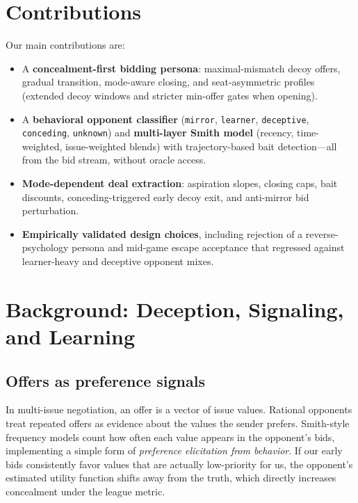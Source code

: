 \documentclass[11pt]{article}
\begin{document}
\section{Contributions}

Our main contributions are:
\begin{itemize}
  \item A \textbf{concealment-first bidding persona}: maximal-mismatch decoy offers, gradual
        transition, mode-aware closing, and seat-asymmetric profiles (extended decoy windows and
        stricter min-offer gates when opening).
  \item A \textbf{behavioral opponent classifier} (\texttt{mirror}, \texttt{learner},
        \texttt{deceptive}, \texttt{conceding}, \texttt{unknown}) and \textbf{multi-layer Smith
        model} (recency, time-weighted, issue-weighted blends) with trajectory-based bait
        detection---all from the bid stream, without oracle access.
  \item \textbf{Mode-dependent deal extraction}: aspiration slopes, closing caps, bait discounts,
        conceding-triggered early decoy exit, and anti-mirror bid perturbation.
  \item \textbf{Empirically validated design choices}, including rejection of a
        reverse-psychology persona and mid-game escape acceptance that regressed against
        learner-heavy and deceptive opponent mixes.
\end{itemize}

\section{Background: Deception, Signaling, and Learning}

\subsection{Offers as preference signals}

In multi-issue negotiation, an offer is a vector of issue values.
Rational opponents treat repeated offers as evidence about the values the sender prefers.
Smith-style frequency models count how often each value appears in the opponent's
bids, implementing a simple form of \emph{preference elicitation from behavior}.
If our early bids consistently favor values that are actually low-priority for us, the
opponent's estimated utility function shifts away from the truth, which directly increases concealment under the league metric.
\end{document}

